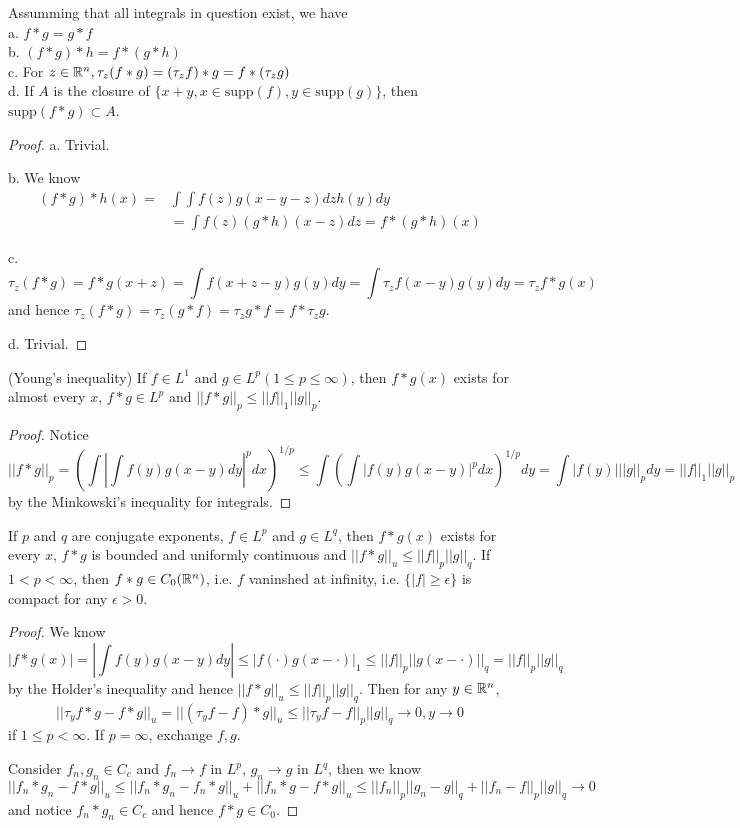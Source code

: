 \begin{proposition}
    Assumming that all integrals in question exist, we have\\
    a. $f*g = g*f$ \\
    b. $(f*g)*h = f*(g*h)$ \\
    c. For $z\in\mathbb{R}^n,\tau_z(f*g) = (\tau_zf)*g = f*(\tau_z g)$ \\
    d. If $A$ is the closure of $\{x+y, x\in \text{supp}(f), y\in\text{supp}(g)\}$, then $\text{supp}(f*g)\subset A$.
\end{proposition}
\begin{proof}\par
    a. Trivial.\par
    b. We know
    \[
    \begin{aligned}
        (f*g)*h(x) = &\int \int f(z)g(x-y-z)dz h(y) dy \\
        & =  \int f(z) (g*h)(x-z) dz = f*(g*h)(x)
    \end{aligned}
    \]\par
    c. \[\tau_z(f*g) = f*g(x+z) = \int f(x+z-y)g(y) dy = \int\tau_zf(x-y)g(y)dy = \tau_zf*g(x)\] and hence $\tau_z(f*g) = \tau_z(g*f) = \tau_zg*f = f*\tau_z g$.\par
    d. Trivial.
\end{proof}

\begin{theorem}
    (Young's inequality) If $f\in L^1$ and $g\in L^p(1\leq p\leq \infty)$, then $f*g(x)$ exists for almost every $x$, $f*g\in L^p$ and $||f*g||_p \leq ||f||_1||g||_p$. 
\end{theorem}
\begin{proof}
    Notice
    \[
    ||f*g||_p = (\int |\int f(y)g(x-y) dy|^p dx)^{1/p} \leq \int (\int |f(y)g(x-y)|^p dx)^{1/p}dy = \int |f(y)|||g||_p dy = ||f||_1||g||_p
    \]
    by the Minkowski's inequality for integrals.
\end{proof}

\begin{proposition}
If $p$ and $q$ are conjugate exponents, $f\in L^p$ and $g\in L^q$, then $f*g(x)$ exists for every $x$, $f*g$ is bounded and uniformly continuous and $||f*g||_u \leq ||f||_p||g||_q$. If $1<p<\infty$, then $f*g \in C_0(\mathbb{R}^n)$, i.e. $f$ vaninshed at infinity, i.e. $\{|f|\geq \epsilon\}$ is compact for any $\epsilon > 0$.
\end{proposition}
\begin{proof}
    We know
    \[
    |f*g(x)| = |\int f(y)g(x-y)dy| \leq |f(\cdot)g(x-\cdot)|_1 \leq ||f||_p||g(x-\cdot)||_q = ||f||_p||g||_q
    \]
    by the Holder's inequality and hence $||f*g||_u \leq ||f||_p||g||_q$. Then for any $y\in \mathbb{R}^n$,
    \[||\tau_y f*g - f*g||_u = ||(\tau_y f-f)*g||_u \leq ||\tau_yf-f||_p||g||_q \to 0, y\to 0\]
    if $1\leq p < \infty$. If $p = \infty$, exchange $f,g$.\par
    Consider $f_n,g_n \in C_c$ and $f_n \to f$ in $L^p$, $g_n\to g$ in $L^q$, then we know
    \[
    ||f_n*g_n-f*g||_u \leq ||f_n*g_n - f_n*g||_u + ||f_n*g - f*g||_u \leq ||f_n||_p ||g_n-g||_q + ||f_n-f||_p||g||_q \to 0
    \]
    and notice $f_n*g_n \in C_c$ and hence $f*g \in C_0$. 
\end{proof}

